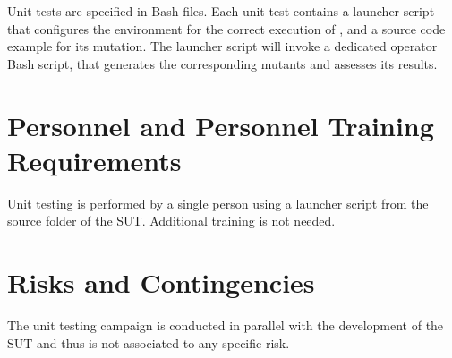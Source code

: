 Unit tests are specified in Bash files. Each unit test contains a launcher script that configures the environment for the correct execution of \FAQAS, and a source code example for its mutation. The launcher script will invoke a dedicated operator Bash script, that generates the corresponding mutants and assesses its results.


\section{Personnel and Personnel Training Requirements}

Unit testing is performed by a single person using a launcher script from the source folder of the SUT. Additional training is not needed.

\section{Risks and Contingencies}

The unit testing campaign is conducted in parallel with the development of the SUT and thus is not associated to any specific risk.